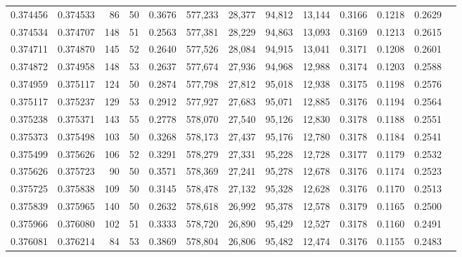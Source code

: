 \begin{tabular}{rrrrrrrrrrrrr}
0.374456 & 0.374533 &    86 &  50 &                                     0.3676 & 577,233 &  28,377 &  94,812 &  13,144 & 0.3166 & 0.1218 & 0.2629 \\
0.374534 & 0.374707 &   148 &  51 &                                     0.2563 & 577,381 &  28,229 &  94,863 &  13,093 & 0.3169 & 0.1213 & 0.2615 \\
0.374711 & 0.374870 &   145 &  52 &                                     0.2640 & 577,526 &  28,084 &  94,915 &  13,041 & 0.3171 & 0.1208 & 0.2601 \\
0.374872 & 0.374958 &   148 &  53 &                                     0.2637 & 577,674 &  27,936 &  94,968 &  12,988 & 0.3174 & 0.1203 & 0.2588 \\
0.374959 & 0.375117 &   124 &  50 &                                     0.2874 & 577,798 &  27,812 &  95,018 &  12,938 & 0.3175 & 0.1198 & 0.2576 \\
0.375117 & 0.375237 &   129 &  53 &                                     0.2912 & 577,927 &  27,683 &  95,071 &  12,885 & 0.3176 & 0.1194 & 0.2564 \\
0.375238 & 0.375371 &   143 &  55 &                                     0.2778 & 578,070 &  27,540 &  95,126 &  12,830 & 0.3178 & 0.1188 & 0.2551 \\
0.375373 & 0.375498 &   103 &  50 &                                     0.3268 & 578,173 &  27,437 &  95,176 &  12,780 & 0.3178 & 0.1184 & 0.2541 \\
0.375499 & 0.375626 &   106 &  52 &                                     0.3291 & 578,279 &  27,331 &  95,228 &  12,728 & 0.3177 & 0.1179 & 0.2532 \\
0.375626 & 0.375723 &    90 &  50 &                                     0.3571 & 578,369 &  27,241 &  95,278 &  12,678 & 0.3176 & 0.1174 & 0.2523 \\
0.375725 & 0.375838 &   109 &  50 &                                     0.3145 & 578,478 &  27,132 &  95,328 &  12,628 & 0.3176 & 0.1170 & 0.2513 \\
0.375839 & 0.375965 &   140 &  50 &                                     0.2632 & 578,618 &  26,992 &  95,378 &  12,578 & 0.3179 & 0.1165 & 0.2500 \\
0.375966 & 0.376080 &   102 &  51 &                                     0.3333 & 578,720 &  26,890 &  95,429 &  12,527 & 0.3178 & 0.1160 & 0.2491 \\
0.376081 & 0.376214 &    84 &  53 &                                     0.3869 & 578,804 &  26,806 &  95,482 &  12,474 & 0.3176 & 0.1155 & 0.2483 \\

\end{tabular}
